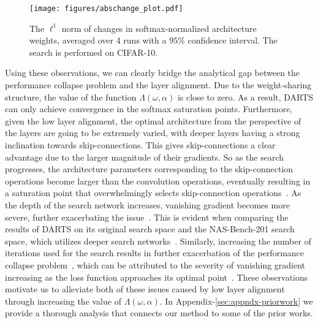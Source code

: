 \documentclass{article} \usepackage{fancyhdr, iclr2023_conference, times}
\newcommand{\lambdafn}{layer alignment\xspace}
\begin{document}
\par \begin{wrapfigure}{r}{0.4\textwidth}
  \vspace{-23pt}
  \begin{center}
    \texttt{[image: figures/abschange\_plot.pdf]}
  \end{center}
  \vspace{-15pt}
  \caption{The $\ell^1$ norm of changes in softmax-normalized architecture weights, averaged over 4 runs with a $95\%$ confidence interval. The search is performed on CIFAR-10.}
  \vspace{-10pt}
  \label{fig:abschange}
\end{wrapfigure}Using these observations, we can clearly bridge the analytical gap between the performance collapse problem and the \lambdafn. Due to the weight-sharing structure, the value of the function $\Lambda(\omega, \alpha)$ is close to zero. As a result, DARTS can only achieve convergence in the softmax saturation points. Furthermore, given the low \lambdafn, the optimal architecture from the perspective of the layers are going to be extremely varied, with deeper layers having a strong inclination towards skip-connections. This gives skip-connections a clear advantage due to the larger magnitude of their gradients. So as the search progresses, the architecture parameters corresponding to the skip-connection operations become larger than the convolution operations, eventually resulting in a saturation point that overwhelmingly selects skip-connection operations~\citep{DBLP:journals/corr/abs-1910-11831, DBLP:conf/iclr/ChuW0LWY21}. As the depth of the search network increases, vanishing gradient becomes more severe, further exacerbating the issue~\citep{DBLP:conf/cvpr/HeZRS16}. This is evident when comparing the results of DARTS on its original search space and the NAS-Bench-201 search space, which utilizes deeper search networks~\citep{DBLP:conf/iclr/Dong020}. Similarly, increasing the number of iterations used for the search results in further exacerbation of the performance collapse problem~\citep{DBLP:journals/corr/abs-1910-11831}, which can be attributed to the severity of vanishing gradient increasing as the loss function approaches its optimal point~\citep{DBLP:conf/cvpr/HeZRS16}. These observations motivate us to alleviate both of these issues caused by low \lambdafn through increasing the value of $\Lambda(\omega, \alpha)$. In Appendix-\ref{sec:appndx-priorwork} we provide a thorough analysis that connects our method to some of the prior works.
\end{document}
